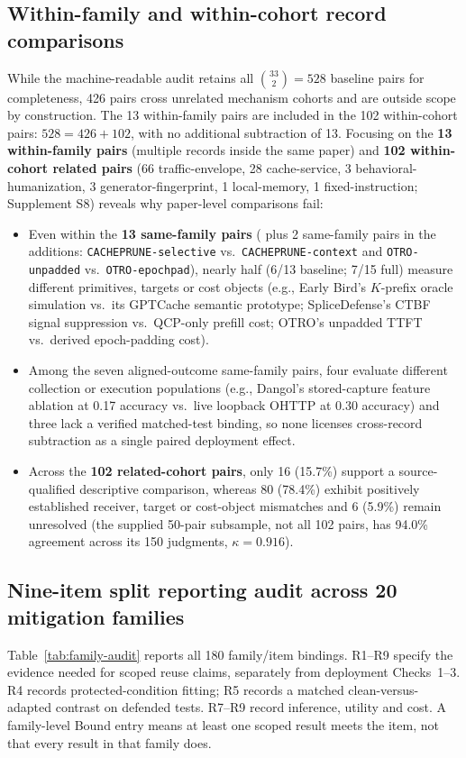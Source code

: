 \subsection{Within-family and within-cohort record comparisons}
While the machine-readable audit retains all $\binom{33}{2}=528$ baseline pairs for completeness, 426 pairs cross unrelated mechanism cohorts and are outside scope by construction. The 13 within-family pairs are included in the 102 within-cohort pairs: $528=426+102$, with no additional subtraction of 13. Focusing on the \textbf{13 within-family pairs} (multiple records inside the same paper) and \textbf{102 within-cohort related pairs} (66 traffic-envelope, 28 cache-service, 3 behavioral-humanization, 3 generator-fingerprint, 1 local-memory, 1 fixed-instruction; Supplement S8) reveals why paper-level comparisons fail:
\begin{itemize}
\item Even within the \textbf{13 same-family pairs} ( plus 2 same-family pairs in the additions: \texttt{CACHEPRUNE-selective} vs.\ \texttt{CACHEPRUNE-context} and \texttt{OTRO-unpadded} vs.\ \texttt{OTRO-epochpad}), nearly half (6/13 baseline; 7/15 full) measure different primitives, targets or cost objects (e.g., Early Bird's $K$-prefix oracle simulation vs.\ its GPTCache semantic prototype; SpliceDefense's CTBF signal suppression vs.\ QCP-only prefill cost; OTRO's unpadded TTFT vs.\ derived epoch-padding cost).
\item Among the seven aligned-outcome same-family pairs, four evaluate different collection or execution populations (e.g., Dangol's stored-capture feature ablation at 0.17 accuracy vs.\ live loopback OHTTP at 0.30 accuracy) and three lack a verified matched-test binding, so none licenses cross-record subtraction as a single paired deployment effect.
\item Across the \textbf{102 related-cohort pairs}, only 16 (15.7\%) support a source-qualified descriptive comparison, whereas 80 (78.4\%) exhibit positively established receiver, target or cost-object mismatches and 6 (5.9\%) remain unresolved (the supplied 50-pair subsample, not all 102 pairs, has 94.0\% agreement across its 150 judgments, $\kappa=0.916$).
\end{itemize}

\subsection{Nine-item split reporting audit across 20 mitigation families}
Table~\ref{tab:family-audit} reports all 180 family/item bindings. R1--R9 specify the evidence needed for scoped reuse claims, separately from deployment Checks~1--3. R4 records protected-condition fitting; R5 records a matched clean-versus-adapted contrast on defended tests. R7--R9 record inference, utility and cost. A family-level Bound entry means at least one scoped result meets the item, not that every result in that family does.


